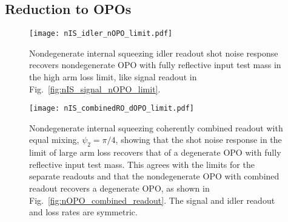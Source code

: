 \subsection{Reduction to OPOs}
\label{sec:nIS_idlerRO_reduction_to_OPOs}

\begin{figure}
	\centering
	\texttt{[image: nIS\_idler\_nOPO\_limit.pdf]}
	\caption{  Nondegenerate internal squeezing idler readout shot noise response recovers nondegenerate OPO with fully reflective input test mass in the high arm loss limit, like signal readout in Fig.~\ref{fig:nIS_signal_nOPO_limit}.}
	\label{fig:nIS_idler_nOPO_limit}
\end{figure}
\begin{figure}
	\centering
	\texttt{[image: nIS\_combinedRO\_dOPO\_limit.pdf]}
	\caption{  Nondegenerate internal squeezing coherently combined readout with equal mixing, $\psi_2=\pi/4$, showing that the shot noise response in the limit of large arm loss recovers that of a degenerate OPO with fully reflective input test mass. This agrees with the limits for the separate readouts and that the nondegenerate OPO with combined readout recovers a degenerate OPO, as shown in Fig.~\ref{fig:nOPO_combined_readout}. The signal and idler readout and loss rates are symmetric.}
	\label{fig:nIS_combinedRO_dOPO_limit}
\end{figure}

